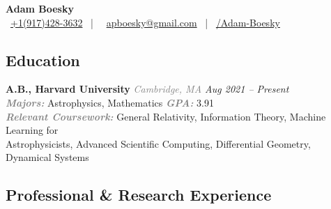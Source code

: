 \documentclass[12pt,letterpaper]{article}
\begin{document}
\thispagestyle{empty}\sloppy\sloppypar\raggedbottom

\begin{center}
      {\huge \textbf{Adam Boesky}}\\[0.5em]
      {\footnotesize
            \faPhoneSquare \ \href{tel:+1-917-428-3632}{+1(917)\hspace{0.075cm}428-3632}
            \ | \
            \faEnvelope \ \href{mailto:apboesky@gmail.com}{apboesky@gmail.com}
            \ | \
            \faGithub \href{https://github.com/Adam-Boesky}{/Adam-Boesky}
      }
  \end{center}

\subsection{Education}

\textbf{A.B., Harvard University} {\small\textit{\textcolor{gray}{Cambridge, MA} \hfill \textcolor{niceblue}{Aug 2021 -- Present}}}\\
\quad \textcolor{gray}{\textbf{\textit{Majors:}}} Astrophysics, Mathematics \quad \textcolor{gray}{\textbf{\textit{GPA:}}} 3.91 \\
\quad \textcolor{gray}{\textbf{\textit{Relevant Coursework:}}} General Relativity, Information Theory, Machine Learning for \\
\quad \quad Astrophysicists, Advanced Scientific Computing, Differential Geometry, Dynamical Systems



\subsection{Professional \& Research Experience}
\end{document}

